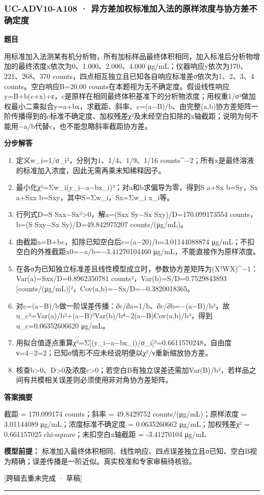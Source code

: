\documentclass[UTF8,11pt,a4paper]{ctexart}
\begin{document}
\subsubsection*{UC-ADV10-A108 · 异方差加权标准加入法的原样浓度与协方差不确定度}
\noindent\textbf{题目}\par
用标准加入法测某有机分析物，所有加标样品最终体积相同，加入标准后分析物增加的最终浓度x依次为0、1.000、2.000、4.000 μg/mL；仪器响应y依次为170、221、268、370 counts，四点相互独立且已知各自响应标准差σ依次为1、2、3、4 counts。空白响应B=20.00 counts在本题视为无不确定度。假设线性响应y=B+b(c+x)+ε，c是原样在相同最终体积基准下的分析物浓度；用权重1/σ²做加权最小二乘拟合y=a+bx，求截距、斜率、c=(a−B)/b、由完整(a,b)协方差矩阵一阶传播得到的c标准不确定度、加权残差χ²及未经空白扣除的x轴截距；说明为何不能用−a/b代替c，也不能忽略斜率截距协方差。\par
\medskip\noindent\textbf{分步解答}
\begin{enumerate}
\item 定义w\_i=1/σ\_i²，分别为1、1/4、1/9、1/16 counts\textasciicircum{}−2；所有x是最终溶液的标准加入浓度，因此无需再乘未知稀释因子。
\item 最小化χ²=Σw\_i(y\_i−a−bx\_i)²；对a和b求偏导为零，得到S a+Sx b=Sy，Sx a+Sxx b=Sxy，其中S=Σw\_i，Sx=Σw\_i x\_i等。
\item 行列式D=S Sxx−Sx²>0，解a=(Sxx Sy−Sx Sxy)/D=170.099173554 counts，b=(S Sxy−Sx Sy)/D=49.842975207 counts/(μg/mL)。
\item 由截距a=B+bc，扣除已知空白后c=(a−20)/b=3.01144088874 μg/mL；不扣空白的外推截距x0=−a/b=−3.41270104460 μg/mL，不能直接作为原样浓度。
\item 在各σ为已知独立标准差且线性模型成立时，参数协方差矩阵为(XᵀWX)\textasciicircum{}−1：Var(a)=Sxx/D=0.8962350781 counts²，Var(b)=S/D=0.7529843893 [counts/(μg/mL)]²，Cov(a,b)=−Sx/D=−0.3820018365。
\item 对c=(a−B)/b做一阶误差传播：∂c/∂a=1/b、∂c/∂b=−(a−B)/b²，故u\_c²=Var(a)/b²+(a−B)²Var(b)/b⁴−2(a−B)Cov(a,b)/b³，得到u\_c=0.06352606620 μg/mL。
\item 用拟合值逐点重算χ²=Σ[(y\_i−a−bx\_i)/σ\_i]²=0.6611570248，自由度ν=4−2=2；已知σ情形不应未经说明便以χ²/ν重新缩放协方差。
\item 核查b>0、D>0及浓度c>0；若空白B有独立误差还需加Var(B)/b²，若样品之间有共模相关误差则必须使用非对角协方差矩阵。
\end{enumerate}
\noindent\textbf{答案摘要}\par
截距 = 170.099174 counts；斜率 = 49.8429752 counts/(μg/mL)；原样浓度 = 3.01144089 μg/mL；浓度标准不确定度 = 0.0635260662 μg/mL；加权残差χ² = 0.661157025 chi-square；未扣空白x轴截距 = -3.41270104 μg/mL\par
\noindent\textbf{模型前提：}
标准加入最终体积相同、线性响应、四点误差独立且σ已知、空白B视为精确；误差传播是一阶近似。真实校准和专家审稿待核验。\par
\noindent\textcolor{red!65!black}{[跨辑去重未完成 · 草稿]} \par
\medskip\hrule\medskip
{}
\end{document}

